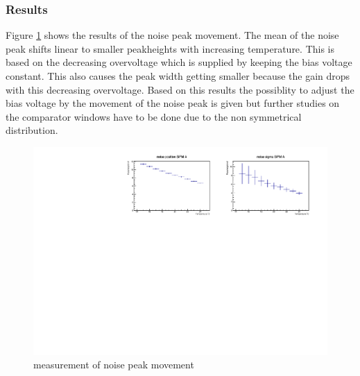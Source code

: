 \subsubsection{Results}
Figure \ref{NoiseMove} shows the results of the noise peak movement. The mean of the noise peak shifts linear to smaller peakheights with increasing temperature. This is based on the decreasing overvoltage which is supplied by keeping the bias voltage constant. 
This also causes the peak width getting smaller because the gain drops with this decreasing overvoltage. Based on this results the possiblity to adjust the bias voltage by the movement of the noise peak is given but further studies on the comparator windows have to be done due to the non symmetrical distribution. 
\begin{figure}[h]
	\centering
	\includegraphics[width = .99\textwidth]{Figures/radermacher/result_ExpGauOnlySipmATriggerNEW.pdf}
	\caption{measurement of noise peak movement}
	\label{NoiseMove}
\end{figure}
